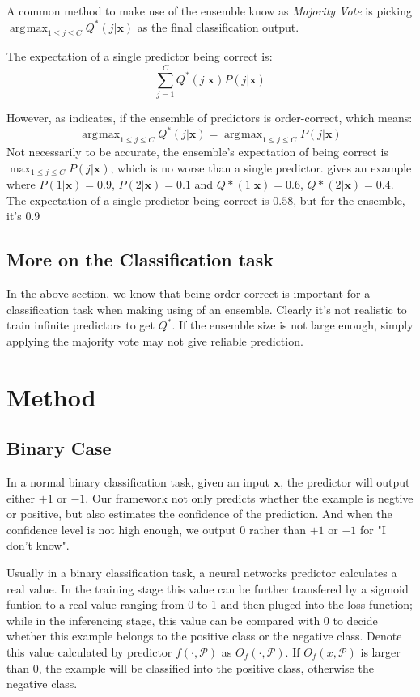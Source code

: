 \documentclass{article}
\DeclareMathOperator*{\argmax}{\arg\!\max}
\begin{document}
A common method to make use of the ensemble know as \textit{Majority Vote} is picking $\argmax_{1\leq j\leq C} Q^*(j|\textbf{x})$ as the final classification output. 

The expectation of a single predictor being correct is:
\begin{equation}
    \sum_{j=1}^{C}Q^*(j|\textbf{x})P(j|\textbf{x})
\end{equation}

However, as \cite{Bagging} indicates, if the ensemble of predictors is order-correct, which means:
\begin{equation}
    \argmax_{1\leq j\leq C} Q^*(j|\textbf{x}) = \argmax_{1\leq j\leq C} P(j|\textbf{x})
\end{equation}
Not necessarily to be accurate, the ensemble's expectation of being correct is $\max_{1\leq j\leq C} P(j|\textbf{x})$, which is no worse than a single predictor.  \cite{Bagging} gives an example where $P(1|\textbf{x})=0.9$, $P(2|\textbf{x})=0.1$ and $Q*(1|\textbf{x})=0.6$, $Q*(2|\textbf{x})=0.4$. The expectation of a single predictor being correct is $0.58$, but for the ensemble, it's $0.9$

\subsection{More on the Classification task}
In the above section, we know that being order-correct is important for a classification task when making using of an ensemble. Clearly it's not realistic to train infinite predictors to get $Q^*$. If the ensemble size is not large enough, simply applying the majority vote may not give reliable prediction.

\section{Method}
\subsection{Binary Case}
In a normal binary classification task, given an input $\textbf{x}$, the predictor will output either $+1$ or $-1$. Our framework not only predicts whether the example is negtive or positive, but also estimates the confidence of the prediction. And when the confidence level is not high enough, we output $0$ rather than $+1$ or $-1$ for "I don't know". 

Usually in a binary classification task, a neural networks predictor calculates a real value. In the training stage this value can be further transfered by a sigmoid funtion to a real value ranging from 0 to 1 and then pluged into the loss function; while in the inferencing stage, this value can be compared with 0 to decide whether this example belongs to the positive class or the negative class. Denote this value calculated by predictor $f \left(\cdot , \mathcal{P}\right)$ as $O_f \left(\cdot , \mathcal{P}\right)$. If $O_f \left(x , \mathcal{P}\right)$ is larger than 0, the example will be classified into the positive class, otherwise the negative class.
\end{document}
